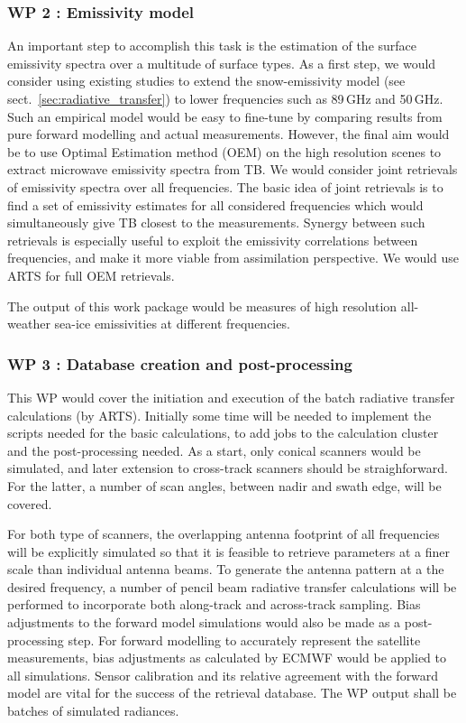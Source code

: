 \documentclass[12pt,oneside,a4paper]{article}
\begin{document}
\subsubsection*{WP 2 : Emissivity model}
%
\label{sec:emissivity}
An important step to accomplish this task is the estimation of the surface emissivity spectra over a multitude of surface types. As a first step, we would consider using existing studies to extend the snow-emissivity model (see sect.~\ref{sec:radiative_transfer}) to lower frequencies such as 89\,GHz and 50\,GHz. Such an empirical model would be easy to fine-tune by comparing results from pure forward modelling and actual measurements. However, the final aim would be to use Optimal Estimation method (OEM) on the high resolution scenes to extract microwave emissivity spectra from TB. We would consider joint retrievals of emissivity spectra over all frequencies. The basic idea of joint retrievals is to find a set of emissivity estimates for all considered frequencies which would simultaneously give TB closest to the measurements. Synergy between such retrievals is especially useful to exploit the emissivity correlations between frequencies, and make it more viable from assimilation perspective. We would use ARTS for full OEM retrievals.

The output of this work package would be measures of high resolution all-weather sea-ice emissivities at different frequencies. 
	
\subsubsection*{WP 3 : Database creation and post-processing}
%
\label{sec:database}	
This WP would cover the initiation and execution of the batch radiative transfer calculations (by ARTS). Initially some time will be needed to implement the scripts needed for the basic calculations, to add jobs to the calculation cluster and the post-processing needed. As a start, only conical scanners would be simulated, and later extension to cross-track scanners should be straighforward. For the latter, a number of scan angles, between nadir and swath edge, will be covered.

For both type of scanners, the overlapping antenna footprint of all frequencies will be explicitly simulated so that it is feasible to retrieve parameters at a finer scale than individual antenna beams. To generate the antenna pattern at a the desired frequency, a number of pencil beam radiative transfer calculations will be performed to incorporate both along-track and across-track sampling. Bias adjustments to the forward model simulations would also be made  as a post-processing step. For forward modelling to accurately represent the satellite measurements, bias adjustments as calculated by ECMWF would be applied to all simulations. Sensor calibration and its relative agreement with the forward model are vital for the success of the retrieval database. 
The WP output shall be batches of simulated radiances.
\end{document}
